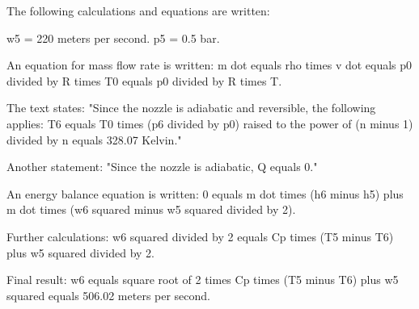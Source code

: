 The following calculations and equations are written:  

w5 = 220 meters per second.  
p5 = 0.5 bar.  

An equation for mass flow rate is written:  
m dot equals rho times v dot equals p0 divided by R times T0 equals p0 divided by R times T.  

The text states:  
"Since the nozzle is adiabatic and reversible, the following applies:  
T6 equals T0 times (p6 divided by p0) raised to the power of (n minus 1) divided by n equals 328.07 Kelvin."  

Another statement:  
"Since the nozzle is adiabatic, Q equals 0."  

An energy balance equation is written:  
0 equals m dot times (h6 minus h5) plus m dot times (w6 squared minus w5 squared divided by 2).  

Further calculations:  
w6 squared divided by 2 equals Cp times (T5 minus T6) plus w5 squared divided by 2.  

Final result:  
w6 equals square root of 2 times Cp times (T5 minus T6) plus w5 squared equals 506.02 meters per second.